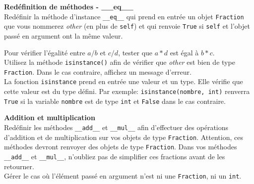 \begin{Exercice}[15 minutes] \textbf{Redéfinition de méthodes - \_\_eq\_\_}\\
	Redéfinir la méthode d'instance \lstinline{__eq__} qui prend en entrée un objet \lstinline{Fraction} que vous nommerez \textit{other} (en plus de \lstinline{self}) et qui renvoie \lstinline{True} si \lstinline{self} et l'objet passé en argument ont la même valeur.
	\begin{conseil}
		Pour vérifier l'égalité entre $a/b$ et $c/d$, tester que $a*d$ est égal à $b*c$. \\
		Utilisez la méthode \lstinline{isinstance()} afin de vérifier que \textit{other} est bien de type \lstinline{Fraction}. Dans le cas contraire, affichez un message d'erreur.
		\\La fonction \lstinline{isinstance} prend en entrée une valeur et un type. Elle vérifie que cette valeur est du type défini. Par exemple: \lstinline{isinstance(nombre, int)} renverra \lstinline{True} si la variable \lstinline{nombre} est de type \lstinline{int} et \lstinline{False} dans le cas contraire.
	\end{conseil}
\end{Exercice}

\begin{Exercice}[15 minutes] \textbf{Addition et multiplication}\\
	Redéfinir les méthodes \lstinline{__add__} et \lstinline{__mul__} afin d'effectuer des opérations d'addition et de multiplication sur vos objets de type \lstinline{Fraction}. Attention, ces méthodes devront renvoyer des objets de type \lstinline{Fraction}. Dans vos méthodes \lstinline{__add__} et \lstinline{__mul__}, n'oubliez pas de simplifier ces fractions avant de les retourner.\\
	Gérer le cas où l'élément passé en argument n'est ni une \lstinline{Fraction}, ni un \lstinline{int}.
\end{Exercice}


\begin{solution}
	
\end{solution}
\begin{solution}
	
\end{solution}




